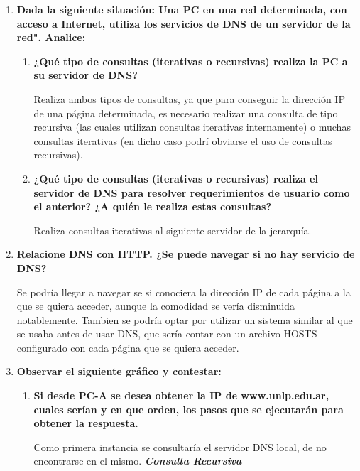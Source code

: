 \documentclass[a4paper,10pt]{article}
\begin{document}
\begin{enumerate}
        \item \textbf{Dada la siguiente situación: Una PC en una red determinada, con acceso a Internet, utiliza los servicios de DNS de un servidor de la red". Analice:}
            \begin{enumerate}
                \item \textbf{¿Qué tipo de consultas (iterativas o recursivas) realiza la PC a su servidor de DNS?}
                
                Realiza ambos tipos de consultas, ya que para conseguir la dirección IP de una página determinada, es necesario realizar una consulta de tipo recursiva (las cuales utilizan consultas iterativas internamente) o muchas consultas iterativas (en dicho caso podrí obviarse el uso de consultas recursivas).
                
                \item \textbf{¿Qué tipo de consultas (iterativas o recursivas) realiza el servidor de DNS para resolver requerimientos de usuario como el anterior? ¿A quién le realiza estas consultas?}
                
                Realiza consultas iterativas al siguiente servidor de la jerarquía.
            \end{enumerate}
        
        \item \textbf{Relacione DNS con HTTP. ¿Se puede navegar si no hay servicio de DNS?}
        
        Se podría llegar a navegar se si conociera la dirección IP de cada página a la que se quiera acceder, aunque la comodidad se vería disminuida notablemente. Tambien se podría optar por utilizar un sistema similar al que se usaba antes de usar DNS, que sería contar con un archivo HOSTS configurado con cada página que se quiera acceder.
        
        \item \textbf{Observar el siguiente gráfico y contestar:}
        
            \begin{enumerate}
                \item \textbf{Si desde PC-A se desea obtener la IP de www.unlp.edu.ar, cuales serían y en que orden, los pasos que se ejecutarán para obtener la respuesta.}
                
                Como primera instancia se consultaría el servidor DNS local, de no encontrarse en el mismo. \textbf{\textit{Consulta Recursiva}}
                

\end{enumerate}
\end{enumerate}
\end{document}
